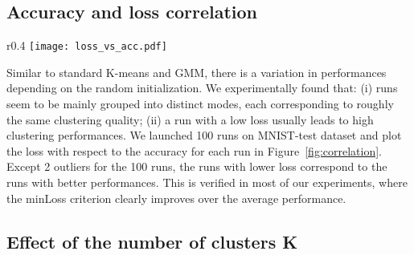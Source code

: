 \documentclass{article}
\begin{document}
\subsection{Accuracy and loss correlation}\label{sec:correl}
\begin{wrapfigure}{r}{0.4\textwidth}
  \vspace{-1.3em}
  \centering
  \texttt{[image: loss\_vs\_acc.pdf]}
  \vspace{-1em}
  \caption{\textbf{Accuracy/loss correlation.} We report loss and accuracy for DTI K-means on 
  MNIST-test.}
  \label{fig:correlation}
  \vspace{-1em}
\end{wrapfigure}
Similar to standard K-means and GMM, there is a variation in performances depending on the 
random initialization. We experimentally found that: (i) runs seem to be mainly grouped into 
distinct modes, each corresponding to roughly the same clustering quality; (ii) a run with a 
low loss usually leads to high clustering performances.  We launched 100 runs on MNIST-test 
dataset and plot the loss with respect to the accuracy for each run in 
Figure~\ref{fig:correlation}. Except 2 outliers for the 100 runs, the runs with lower loss 
correspond to the runs with better performances. This is verified in most of our experiments, 
where the minLoss criterion clearly improves over the average performance.


\subsection{Effect of the number of clusters K}\label{sec:effect_k}
\end{document}
